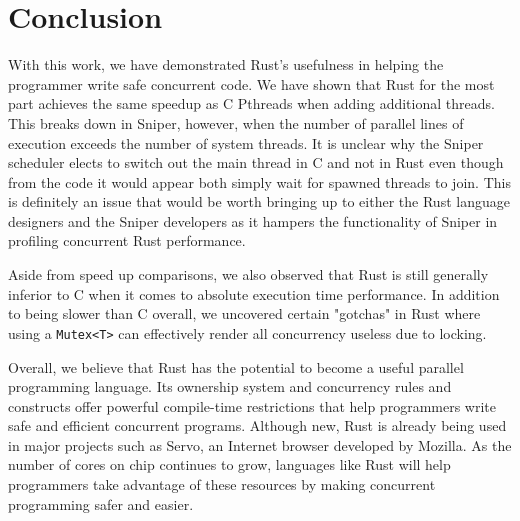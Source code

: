 \section{Conclusion}\label{sec::conclusion}
With this work, we have demonstrated Rust's usefulness in helping the programmer write safe concurrent code. We have shown that Rust for the most part achieves the same speedup as C Pthreads when adding additional threads. This breaks down in Sniper, however, when the number of parallel lines of execution exceeds the number of system threads. It is unclear why the Sniper scheduler elects to switch out the main thread in C and not in Rust even though from the code it would appear both simply wait for spawned threads to join.
This is definitely an issue that would be worth bringing up to either the Rust language designers and the Sniper developers as it hampers the functionality of Sniper in profiling concurrent Rust performance.
    
    Aside from speed up comparisons, we also observed that Rust is still generally inferior to C when it comes to absolute execution time performance. In addition to being slower than C overall, we uncovered certain "gotchas" in Rust where using a \texttt{Mutex<T>} can effectively render all concurrency useless due to locking.
    
    Overall, we believe that Rust has the potential to become a useful parallel programming language. Its ownership system and concurrency rules and constructs offer powerful compile-time restrictions that help programmers write safe and efficient concurrent programs. Although new, Rust is already being used in major projects such as Servo, an Internet browser developed by Mozilla. As the number of cores on chip continues to grow, languages like Rust will help programmers take advantage of these resources by making concurrent programming safer and easier.